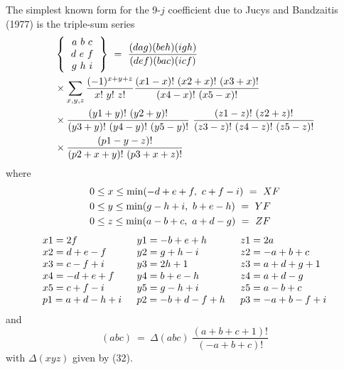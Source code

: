 The simplest known form for the 9-$j$ coefficient due to Jucys and Bandzaitis (1977) is 
the triple-sum series
\begin{equation}
\begin{split}
& \left\{
\begin{tabular}{c}
$a \ b \ c$\\   
$d \ e\ f$\\ 
$g \ h \ i$\\ 
\end{tabular} 
\right\} \
=\ \frac{(dag)(beh)(igh)}{(def)(bac)(icf)}\\
& \times \sum_{x,y,z} \frac{(-1)^{x+y+z}}{x!\ y!\ z!} \frac{(x1-x)!\ (x2+x)!\ (x3+x)!}
{(x4-x)!\ (x5-x)!}\\
& \times\frac{(y1+y)!\ (y2+y)!}{(y3+y)!\ (y4-y)!\ (y5-y)!} \ \frac{(z1-z)!\ (z2+z)!}{(z3-z)!\ (z4-z)!\ (z5-z)!}\\
& \times \frac{(p1-y-z)!}{(p2+x+y)!\ (p3+x+z)!} \label{chap29-eq54}
\end{split}
\end{equation}
where
\begin{equation}
\begin{split}
& 0 \leq x \leq {\rm min} (-d+e+f,\ c+f-i)\ =\ XF \\
& 0 \leq y \leq {\rm min} ( g-h+i,\ b+e-h)\ =\ YF \\
& 0 \leq z \leq {\rm min} ( a-b+c,\ a+d-g)\ =\ ZF \label{chap29-eq55}
\end{split}
\end{equation}
\begin{equation}
\begin{tabular}{lll}
$x1=2f$ &\ $y1=-b+e+h$ &\ $z1=2a$ \\
$x2=d+e-f$ &\ $y2=g+h-i$ &\ $z2=-a+b+c$ \\
$x3=c-f+i$ &\ $y3=2h+1$ &\ $z3=a+d+g+1$\\
$x4=-d+e+f$ &\ $y4=b+e-h$ &\ $z4=a+d-g$ \\
$x5=c+f-i$ &\ $y5=g-h+i$ &\ $z5=a-b+c$ \\
$p1=a+d-h+i$ &\ $p2=-b+d-f+h$ &\ $p3=-a+b-f+i$\label{chap29-eq56}
\end{tabular}
\end{equation}
and 
\begin{equation}
(abc)\ =\ \Delta(abc)\ \frac{(a+b+c+1)!}{(-a+b+ c)!}\label{chap29-eq57}
\end{equation}
with $\Delta(xyz)$ given by (32).


